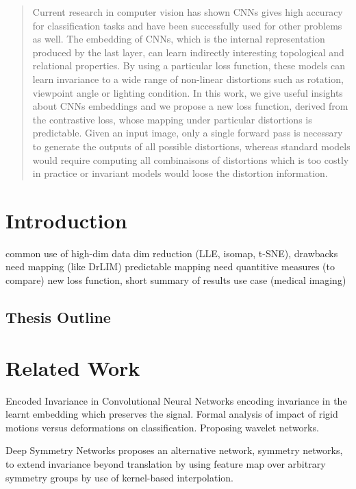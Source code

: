 \documentclass[a4paper,12pt]{report}
\begin{document}
\begin{abstract}
    Current research in computer vision has shown CNNs gives high accuracy for classification tasks and have been successfully used for other problems as well.
    The embedding of CNNs, which is the internal representation produced by the last layer, can learn indirectly interesting topological and relational properties.
    By using a particular loss function, these models can learn invariance to a wide range of non-linear distortions such as rotation, viewpoint angle or lighting condition.
    In this work, we give useful insights about CNNs embeddings and we propose a new loss function, derived from the contrastive loss, whose mapping under particular distortions is predictable.
    Given an input image, only a single forward pass is necessary to generate the outputs of all possible distortions, whereas standard models would require computing all combinaisons of distortions which is too costly in practice or invariant models would loose the distortion information.
\end{abstract}

\chapter{Introduction}
common use of high-dim data
dim reduction (LLE, isomap, t-SNE), drawbacks
need mapping (like DrLIM)
predictable mapping
need quantitive measures (to compare)
new loss function, short summary of results
use case (medical imaging)

\section{Thesis Outline}

\chapter{Related Work}
Encoded Invariance in Convolutional Neural Networks
encoding invariance in the learnt embedding which preserves the signal. Formal analysis of impact of rigid motions versus deformations on classification. Proposing wavelet networks.

Deep Symmetry Networks
proposes an alternative network, symmetry networks, to extend invariance beyond translation by using feature map over arbitrary symmetry groups by use of kernel-based interpolation.
\end{document}
